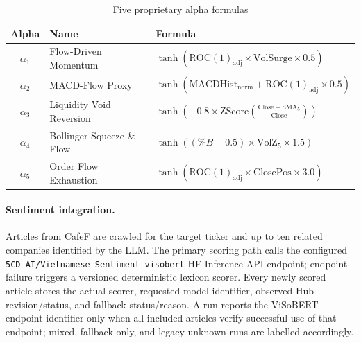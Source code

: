 \begin{table}[htb]
\centering
\caption{Five proprietary alpha formulas}
\label{tab:proprietary_alphas}
\renewcommand{\arraystretch}{1.25}

\begin{tabularx}{\textwidth}{|c|l|X|}
\hline
\textbf{Alpha} & \textbf{Name} & \textbf{Formula} \\
\hline

$\alpha_1$ &
Flow-Driven Momentum &
$\tanh(\mathrm{ROC}(1)_{\mathrm{adj}} \times \mathrm{VolSurge} \times 0.5)$ \\
\hline

$\alpha_2$ &
MACD-Flow Proxy &
$\tanh(\mathrm{MACDHist}_{\mathrm{norm}} + \mathrm{ROC}(1)_{\mathrm{adj}} \times 0.5)$ \\
\hline

$\alpha_3$ &
Liquidity Void Reversion &
$\tanh\!\left(-0.8 \times \mathrm{ZScore}\!\left(\frac{\mathrm{Close} - \mathrm{SMA}_5}{\mathrm{Close}}\right)\right)$ \\
\hline

$\alpha_4$ &
Bollinger Squeeze \& Flow &
$\tanh((\%B - 0.5) \times \mathrm{VolZ}_5 \times 1.5)$ \\
\hline

$\alpha_5$ &
Order Flow Exhaustion &
$\tanh(\mathrm{ROC}(1)_{\mathrm{adj}} \times \mathrm{ClosePos} \times 3.0)$ \\
\hline

\end{tabularx}

\vspace{0.5em}

\end{table}


\paragraph{Sentiment integration.}
Articles from CafeF are crawled for the target ticker and up to ten related companies identified by the LLM. The primary scoring path calls the configured \texttt{5CD-AI/}\allowbreak\texttt{Vietnamese-Sentiment-}\allowbreak\texttt{visobert} HF Inference API endpoint; endpoint failure triggers a versioned deterministic lexicon scorer. Every newly scored article stores the actual scorer, requested model identifier, observed Hub revision/status, and fallback status/reason. A run reports the ViSoBERT endpoint identifier only when all included articles verify successful use of that endpoint; mixed, fallback-only, and legacy-unknown runs are labelled accordingly.

